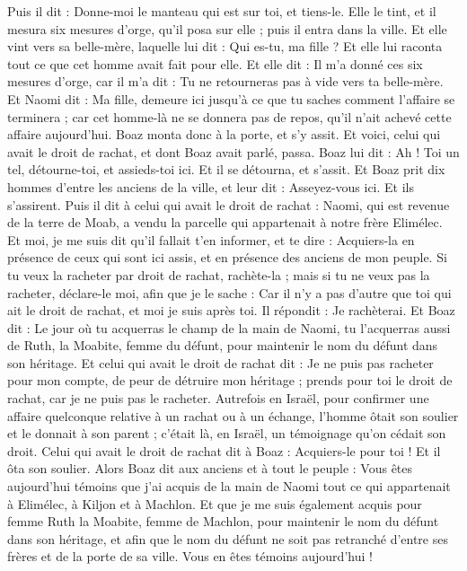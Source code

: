 \begin{multicols}{2}
Puis il dit : Donne-moi le manteau qui est sur toi, et tiens-le. Elle le tint, et il mesura six mesures d'orge, qu'il posa sur elle ; puis il entra dans la ville.
Et elle vint vers sa belle-mère, laquelle lui dit : Qui es-tu, ma fille ? Et elle lui raconta tout ce que cet homme avait fait pour elle.
Et elle dit : Il m'a donné ces six mesures d'orge, car il m'a dit : Tu ne retourneras pas à vide vers ta belle-mère.
Et Naomi dit : Ma fille, demeure ici jusqu'à ce que tu saches comment l'affaire se terminera ; car cet homme-là ne se donnera pas de repos, qu'il n'ait achevé cette affaire aujourd'hui.
\VerseOne{}Boaz monta donc à la porte, et s'y assit. Et voici, celui qui avait le droit de rachat, et dont Boaz avait parlé, passa. Boaz lui dit : Ah ! Toi un tel, détourne-toi, et assieds-toi ici. Et il se détourna, et s'assit.
Et Boaz prit dix hommes d'entre les anciens de la ville, et leur dit : Asseyez-vous ici. Et ils s'assirent.
Puis il dit à celui qui avait le droit de rachat : Naomi, qui est revenue de la terre de Moab, a vendu la parcelle qui appartenait à notre frère Elimélec.
Et moi, je me suis dit qu'il fallait t'en informer, et te dire : Acquiers-la en présence de ceux qui sont ici assis, et en présence des anciens de mon peuple. Si tu veux la racheter par droit de rachat, rachète-la ; mais si tu ne veux pas la racheter, déclare-le moi, afin que je le sache : Car il n'y a pas d'autre que toi qui ait le droit de rachat, et moi je suis après toi. Il répondit : Je rachèterai.
Et Boaz dit : Le jour où tu acquerras le champ de la main de Naomi, tu l'acquerras aussi de Ruth, la Moabite, femme du défunt, pour maintenir le nom du défunt dans son héritage.
Et celui qui avait le droit de rachat dit : Je ne puis pas racheter pour mon compte, de peur de détruire mon héritage ; prends pour toi le droit de rachat, car je ne puis pas le racheter.
Autrefois en Israël, pour confirmer une affaire quelconque relative à un rachat ou à un échange, l'homme ôtait son soulier et le donnait à son parent ; c'était là, en Israël, un témoignage qu'on cédait son droit.
Celui qui avait le droit de rachat dit à Boaz : Acquiers-le pour toi ! Et il ôta son soulier.
Alors Boaz dit aux anciens et à tout le peuple : Vous êtes aujourd'hui témoins que j'ai acquis de la main de Naomi tout ce qui appartenait à Elimélec, à Kiljon et à Machlon.
Et que je me suis également acquis pour femme Ruth la Moabite, femme de Machlon, pour maintenir le nom du défunt dans son héritage, et afin que le nom du défunt ne soit pas retranché d'entre ses frères et de la porte de sa ville. Vous en êtes témoins aujourd'hui !

\end{multicols}
